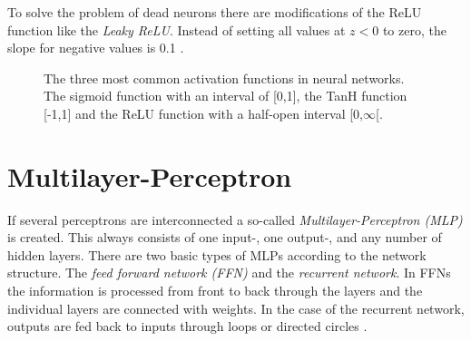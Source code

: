 To solve the problem of dead neurons there are modifications of the ReLU function like the \textit{Leaky ReLU}. Instead of setting all values at $z<0$ to zero, the slope for negative values is 0.1 \cite{activationfunction}.


\begin{figure}[h]
    \centering
\caption[Aktivierungsfunktionen]{The three most common activation functions in neural networks. The sigmoid function with an interval of [0,1], the TanH function [-1,1] and the ReLU function with a half-open interval [0,$\infty$[.}
\end{figure}


\section{Multilayer-Perceptron} \label{sec:training}

If several perceptrons are interconnected a so-called \textit{Multilayer-Perceptron (MLP)} is created. This always consists of one input-, one output-, and any number of hidden layers. There are two basic types of MLPs according to the network structure. The \textit{feed forward network (FFN)} and the \textit{recurrent network}. In FFNs the information is processed from front to back through the layers and the individual layers are connected with weights. In the case of the recurrent network, outputs are fed back to inputs through loops or directed circles \cite{computational2015intelligence}.


